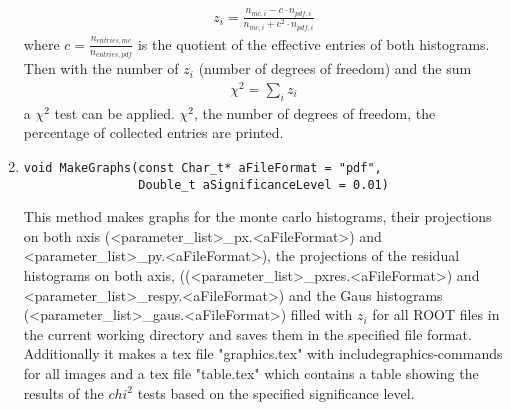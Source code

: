 \begin{enumerate}
\begin{gather}
z_i = \frac{n_{mc,i} - c \cdot n_{pdf,i}}{n_{mc,i} + c^2 \cdot n_{pdf,i}}
\end{gather} 
where $c = \frac{n_{entries,mc}}{n_{entries,pdf}}$ is the quotient of the effective entries of both histograms.
Then with the number of $z_i$ (number of degrees of freedom) and the sum
\begin{gather}
\chi^2 = \sum_i z_i
\end{gather}
a $\chi^2$ test can be applied.
$\chi^2$, the number of degrees of freedom, the percentage of collected entries
are printed. 
\item
\begin{verbatim}
void MakeGraphs(const Char_t* aFileFormat = "pdf",
                Double_t aSignificanceLevel = 0.01)
\end{verbatim}
This method makes graphs for the monte carlo histograms, their projections on both axis (<parameter\_list>\_px.<aFileFormat>) and <parameter\_list>\_py.<aFileFormat>), the projections of the residual histograms on both axis, ((<parameter\_list>\_pxres.<aFileFormat>) and <parameter\_list>\_respy.<aFileFormat>)
and the Gaus histograms (<parameter\_list>\_gaus.<aFileFormat>) filled with $z_i$ for all ROOT files in the current working directory and saves them in the specified file format. \\
Additionally it makes a tex file "graphics.tex" with includegraphics-commands for all images and a tex file "table.tex" which contains a table showing the results of the $chi^2$ tests based on the specified significance level.
\end{enumerate}